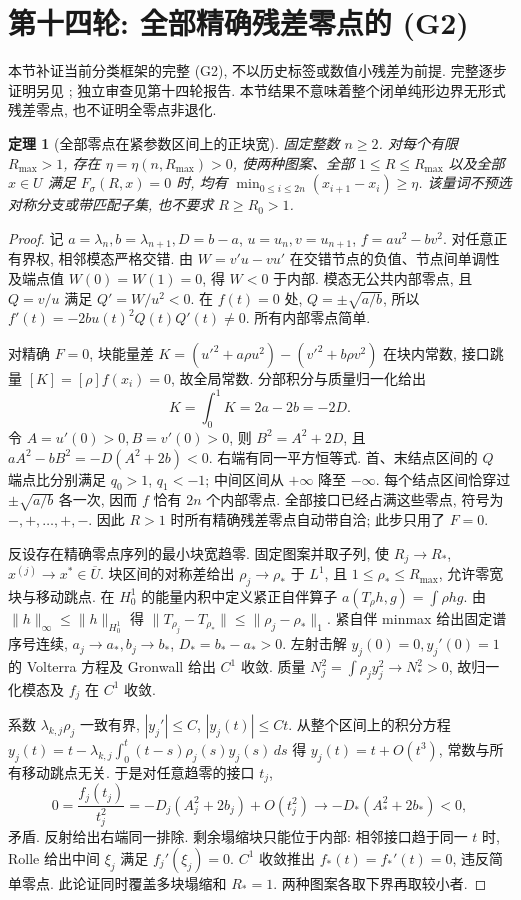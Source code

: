 \documentclass[UTF8]{ctexart}
\newtheorem{theorem}{定理}[section]
\begin{document}
\section{第十四轮: 全部精确残差零点的 (G2)}\label{sec:g2round14}

本节补证当前分类框架的完整 (G2), 不以历史标签或数值小残差为前提.
完整逐步证明另见 ; 独立审查见第十四轮报告.
本节结果不意味着整个闭单纯形边界无形式残差零点, 也不证明全零点非退化.

\begin{theorem}[全部零点在紧参数区间上的正块宽]\label{thm:g2round14}
固定整数 $n\ge2$. 对每个有限 $R_{\max}>1$, 存在
$\eta=\eta(n,R_{\max})>0$, 使两种图案、全部 $1\le R\le R_{\max}$
以及全部 $x\in U$ 满足 $F_\sigma(R,x)=0$ 时, 均有
$\min_{0\le i\le2n}(x_{i+1}-x_i)\ge\eta$.
该量词不预选对称分支或带匹配子集, 也不要求 $R\ge R_0>1$.
\end{theorem}
\begin{proof}
记 $a=\lambda_n,b=\lambda_{n+1},D=b-a$, $u=u_n,v=u_{n+1}$,
$f=au^2-bv^2$. 对任意正有界权, 相邻模态严格交错.
由 $W=v'u-vu'$ 在交错节点的负值、节点间单调性及端点值 $W(0)=W(1)=0$,
得 $W<0$ 于内部. 模态无公共内部零点, 且 $Q=v/u$ 满足 $Q'=W/u^2<0$.
在 $f(t)=0$ 处, $Q=\pm\sqrt{a/b}$, 所以
$f'(t)=-2bu(t)^2Q(t)Q'(t)\ne0$. 所有内部零点简单.

对精确 $F=0$, 块能量差
$K=(u'^2+a\rho u^2)-(v'^2+b\rho v^2)$ 在块内常数,
接口跳量 $[K]=[\rho]f(x_i)=0$, 故全局常数. 分部积分与质量归一化给出
\[
K=\int_0^1K=2a-2b=-2D.
\]
令 $A=u'(0)>0,B=v'(0)>0$, 则 $B^2=A^2+2D$, 且
$aA^2-bB^2=-D(A^2+2b)<0$. 右端有同一平方恒等式.
首、末结点区间的 $Q$ 端点比分别满足 $q_0>1$, $q_1<-1$;
中间区间从 $+\infty$ 降至 $-\infty$.
每个结点区间恰穿过 $\pm\sqrt{a/b}$ 各一次, 因而 $f$ 恰有 $2n$ 个内部零点.
全部接口已经占满这些零点, 符号为 $-,+,\ldots,+,-$.
因此 $R>1$ 时所有精确残差零点自动带自洽; 此步只用了 $F=0$.

反设存在精确零点序列的最小块宽趋零. 固定图案并取子列,
使 $R_j\to R_*$, $x^{(j)}\to x^*\in\overline U$.
块区间的对称差给出 $\rho_j\to\rho_*$ 于 $L^1$,
且 $1\le\rho_*\le R_{\max}$, 允许零宽块与移动跳点.
在 $H_0^1$ 的能量内积中定义紧正自伴算子
$a(T_\rho h,g)=\int\rho hg$.
由 $\|h\|_\infty\le\|h\|_{H_0^1}$ 得
$\|T_{\rho_j}-T_{\rho_*}\|\le\|\rho_j-\rho_*\|_1$.
紧自伴 minmax 给出固定谱序号连续, $a_j\to a_*,b_j\to b_*$,
$D_*=b_*-a_*>0$.
左射击解 $y_j(0)=0,y_j'(0)=1$ 的 Volterra 方程及 Gronwall
给出 $C^1$ 收敛. 质量 $N_j^2=\int\rho_jy_j^2\to N_*^2>0$,
故归一化模态及 $f_j$ 在 $C^1$ 收敛.

系数 $\lambda_{k,j}\rho_j$ 一致有界, $|y_j'|\le C$, $|y_j(t)|\le Ct$.
从整个区间上的积分方程
$y_j(t)=t-\lambda_{k,j}\int_0^t(t-s)\rho_j(s)y_j(s)\,ds$
得 $y_j(t)=t+O(t^3)$, 常数与所有移动跳点无关.
于是对任意趋零的接口 $t_j$,
\[
0=\frac{f_j(t_j)}{t_j^2}
=-D_j(A_j^2+2b_j)+O(t_j^2)
\longrightarrow-D_*(A_*^2+2b_*)<0,
\]
矛盾. 反射给出右端同一排除. 剩余塌缩块只能位于内部:
相邻接口趋于同一 $t$ 时, Rolle 给出中间 $\xi_j$ 满足 $f_j'(\xi_j)=0$.
$C^1$ 收敛推出 $f_*(t)=f_*'(t)=0$, 违反简单零点.
此论证同时覆盖多块塌缩和 $R_* =1$. 两种图案各取下界再取较小者.
\end{proof}
\end{document}
